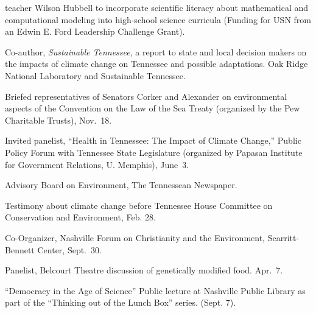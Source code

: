   teacher Wilson Hubbell to incorporate scientific literacy about mathematical
  and computational modeling into high-school science curricula (Funding for
  USN from an Edwin E. Ford Leadership Challenge Grant).
\item[2011--2012] Co-author, \emph{Sustainable Tennessee}, a report to state
  and local decision makers on the impacts of climate change on Tennessee and
  possible adaptations. Oak Ridge National Laboratory and Sustainable Tennessee.
\item[2009] Briefed representatives of Senators Corker and Alexander on
  environmental aspects of the Convention on the Law of the Sea Treaty
  (organized by the Pew Charitable Trusts), Nov.~18.
\item[2009] Invited panelist, ``Health in Tennessee: The Impact of Climate
  Change,'' Public Policy Forum with Tennessee State Legislature (organized by
  Papasan Institute for Government Relations, U. Memphis), June~3.
\item[2007--2009] Advisory Board on Environment, The Tennessean Newspaper.
\item[2008] Testimony about climate change before Tennessee House Committee on
  Conservation and Environment, Feb. 28.
\item[2006] Co-Organizer, Nashville Forum on Christianity and the Environment,
  Scarritt-Bennett Center, Sept.~30.
\item[2006] Panelist, Belcourt Theatre discussion of genetically modified food.
  Apr.~7.
\item[2005] ``Democracy in the Age of Science'' Public lecture at Nashville
  Public Library as part of the ``Thinking out of the Lunch Box'' series.
  (Sept. 7).
